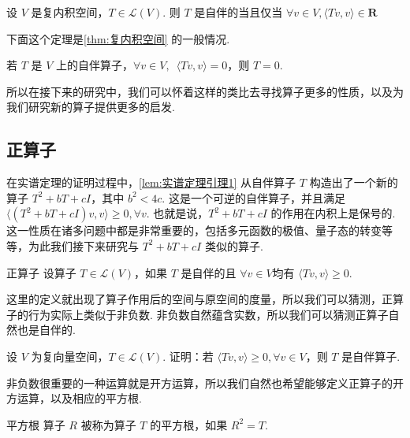 \begin{theorem}{}{}
    设 $ V $ 是复内积空间，$ T \in \mathcal{L}(V) $. 则 $ T $ 是自伴的当且仅当 $ \forall v \in V, \langle Tv, v \rangle \in \mathbf{R} $
\end{theorem}

下面这个定理是\autoref{thm:复内积空间} 的一般情况.

\begin{theorem}{}{}
    若 $ T $ 是 $ V $ 上的自伴算子，$ \forall v \in V,\enspace \langle Tv, v \rangle = 0 $，则 $ T = 0 $.
\end{theorem}

所以在接下来的研究中，我们可以怀着这样的类比去寻找算子更多的性质，以及为我们研究新的算子提供更多的启发.

\subsection{正算子}

在实谱定理的证明过程中，\autoref{lem:实谱定理引理1} 从自伴算子 $ T $ 构造出了一个新的算子 $ T^2 + bT + cI$，其中 $ b^2 < 4c $. 这是一个可逆的自伴算子，并且满足 $\langle (T^2 + bT + cI)v, v \rangle \geqslant 0, \forall v$. 也就是说，$ T^2 + bT + cI $ 的作用在内积上是保号的. 这一性质在诸多问题中都是非常重要的，包括多元函数的极值、量子态的转变等等，为此我们接下来研究与 $ T^2 + bT + cI $ 类似的算子.

\begin{definition}{正算子}{} 
    设算子 $ T \in \mathcal{L}(V) $，如果 $ T $ 是自伴的且 $ \forall v \in V $均有 $ \langle Tv, v \rangle \geqslant 0 $.
\end{definition}

这里的定义就出现了算子作用后的空间与原空间的度量，所以我们可以猜测，正算子的行为实际上类似于非负数. 非负数自然蕴含实数，所以我们可以猜测正算子自然也是自伴的.

\begin{example}{}{}
    设 $ V $ 为复向量空间，$ T \in \mathcal{L}(V) $. 证明：若 $\langle Tv, v \rangle \geqslant 0, \forall v \in V$，则 $ T $ 是自伴算子.
\end{example}

非负数很重要的一种运算就是开方运算，所以我们自然也希望能够定义正算子的开方运算，以及相应的平方根.

\begin{definition}{平方根}{} 
    算子 $ R $ 被称为算子 $ T $ 的平方根，如果 $ R^{2} = T $.
\end{definition}

